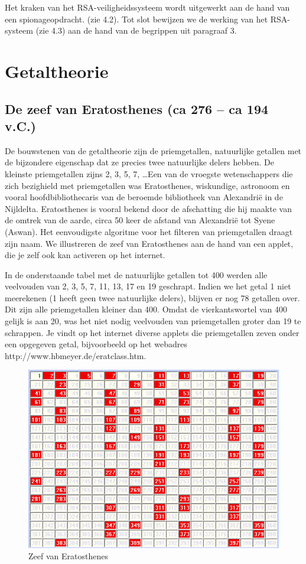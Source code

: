 Het kraken van het RSA-veiligheidssysteem wordt uitgewerkt aan de hand van een spionageopdracht. (zie 4.2). Tot slot bewijzen we de werking van het RSA-systeem (zie 4.3) aan de hand van de begrippen uit paragraaf 3.

\newpage

\section{Getaltheorie}

\subsection{De zeef van Eratosthenes (ca  276 – ca 194 v.C.)}

De bouwstenen van de getaltheorie zijn de priemgetallen, natuurlijke getallen met de bijzondere eigenschap dat ze precies twee natuurlijke delers hebben. De kleinste priemgetallen zijns 2, 3, 5, 7, \ldots Een van de vroegste wetenschappers die zich bezighield met priemgetallen was Eratosthenes, wiskundige, astronoom en vooral hoofdbibliothecaris van de beroemde bibliotheek van Alexandrië in de Nijldelta. Eratosthenes is vooral bekend door de afschatting die hij maakte van de omtrek van de aarde, circa 50 keer de afstand van Alexandrië tot Syene (Aswan). Het eenvoudigste algoritme voor het filteren van priemgetallen draagt zijn naam. We illustreren de zeef van Eratosthenes aan de hand van een applet, die je zelf ook kan activeren op het internet. 

In de onderstaande tabel met de natuurlijke getallen tot 400 werden alle veelvouden van 2, 3, 5, 7, 11, 13, 17 en 19 geschrapt. Indien we het getal 1 niet meerekenen (1 heeft geen twee natuurlijke delers), blijven er nog 78 getallen over. Dit zijn alle  priemgetallen kleiner dan 400. Omdat de vierkantswortel van 400 gelijk is aan 20, was het niet nodig veelvouden van priemgetallen groter dan 19 te schrappen. Je vindt op het internet diverse applets die priemgetallen zeven onder een opgegeven getal, bijvoorbeeld op het webadres http://www.hbmeyer.de/eratclass.htm.

\begin{figure} [h]
\label{eratosthenes}
\centering
\includegraphics[width=\textwidth]{zeef.jpg}
\caption{Zeef van Eratosthenes}
\end{figure}

